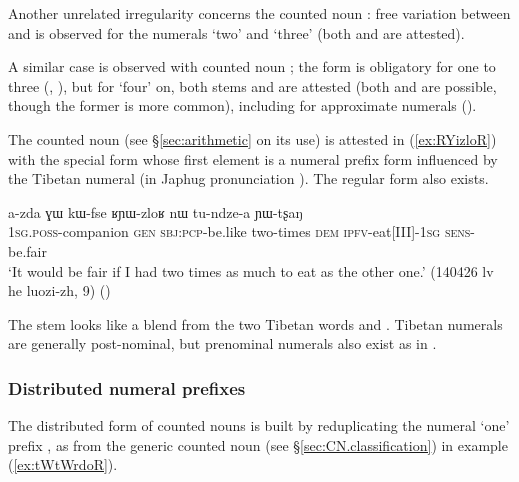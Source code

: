 Another unrelated irregularity concerns the counted noun : free variation between  and  is observed for the numerals `two' and `three' (both  and  are attested).

A similar case is observed with counted noun ; the form  is obligatory for one to three (, ), but for `four' on, both stems  and  are attested (both  and  are possible, though the former is more common), including for approximate numerals ().  

The counted noun  (see §\ref{sec:arithmetic} on its use) is attested in (\ref{ex:RYizloR}) with the special form  whose first element is a numeral prefix form  influenced by the Tibetan numeral  (in Japhug pronunciation ). The regular form  also exists.
 
\begin{exe}
\ex \label{ex:RYizloR}
\gll a-zda ɣɯ kɯ-fse ʁɲɯ-zloʁ nɯ tu-ndze-a ɲɯ-tʂaŋ \\
 \textsc{1sg}.\textsc{poss}-companion \textsc{gen} \textsc{sbj}:\textsc{pcp}-be.like two-times \textsc{dem} \textsc{ipfv}-eat[III]-\textsc{1sg} \textsc{sens}-be.fair \\
\glt `It would be fair if I had two times as much to eat as the other one.' (140426 lv he luozi-zh, 9)
()
\end{exe}

The stem  looks like a blend from the two Tibetan words  and . Tibetan numerals are generally post-nominal, but prenominal numerals also exist as in .

\subsubsection{Distributed numeral prefixes} \label{sec:numeral.prefixes.distributed}
The distributed form of counted nouns is built by reduplicating the numeral `one' prefix , as  from the generic counted noun  (see §\ref{sec:CN.classification}) in example (\ref{ex:tWtWrdoR}).

